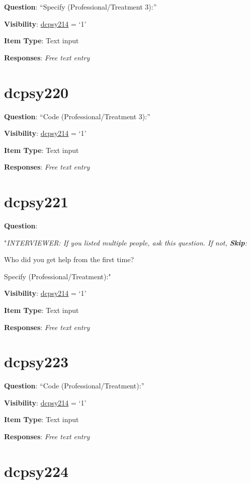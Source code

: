 \documentclass[]{book}
\begin{document}
\textbf{Question}: ``Specify (Professional/Treatment 3):''

\textbf{Visibility}: \protect\hyperlink{dcpsy214}{dcpsy214} = `1'

\textbf{Item Type}: Text input

\textbf{Responses}: \emph{Free text entry}

\hypertarget{dcpsy220}{%
\section{dcpsy220}\label{dcpsy220}}

\textbf{Question}: ``Code (Professional/Treatment 3):''

\textbf{Visibility}: \protect\hyperlink{dcpsy214}{dcpsy214} = `1'

\textbf{Item Type}: Text input

\textbf{Responses}: \emph{Free text entry}

\hypertarget{dcpsy221}{%
\section{dcpsy221}\label{dcpsy221}}

\textbf{Question}:

"\emph{INTERVIEWER: If you listed multiple people, ask this question. If not, \textbf{Skip}:}

Who did you get help from the first time?

Specify (Professional/Treatment):"

\textbf{Visibility}: \protect\hyperlink{dcpsy214}{dcpsy214} = `1'

\textbf{Item Type}: Text input

\textbf{Responses}: \emph{Free text entry}

\hypertarget{dcpsy223}{%
\section{dcpsy223}\label{dcpsy223}}

\textbf{Question}: ``Code (Professional/Treatment):''

\textbf{Visibility}: \protect\hyperlink{dcpsy214}{dcpsy214} = `1'

\textbf{Item Type}: Text input

\textbf{Responses}: \emph{Free text entry}

\hypertarget{dcpsy224}{%
\section{dcpsy224}\label{dcpsy224}}
\end{document}
